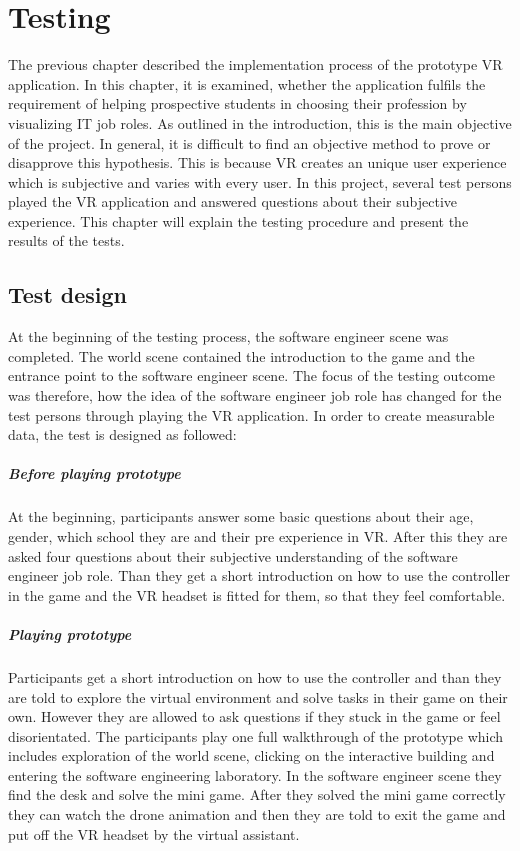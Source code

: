 \chapter{Testing}\label{testing}
The previous chapter described the implementation process of the prototype VR application. In this chapter, it is examined, whether the application fulfils the requirement of helping prospective students in choosing their profession by visualizing IT job roles. As outlined in the introduction, this is the main objective of the project. In general, it is difficult to find an objective method to prove or disapprove this hypothesis. This is because VR creates an unique user experience which is subjective and varies with every user. In this project, several test persons played the VR application and answered questions about their subjective experience. This chapter will explain the testing procedure and present the results of the tests.
\section{Test design}
At the beginning of the testing process, the software engineer scene was completed. The world scene contained the introduction to the game and the entrance point to the software engineer scene. The focus of the testing outcome was therefore, how the idea of the software engineer job role has changed for the test persons through playing the VR application. In order to create measurable data, the test is designed as followed:

\paragraph{Before playing prototype} At the beginning, participants answer some basic questions about their age, gender, which school they are and their pre experience in VR. After this they are asked four questions about their subjective understanding of the software engineer job role. Than they get a short introduction on how to use the controller in the game and the VR headset is fitted for them, so that they feel comfortable. 
\paragraph{Playing prototype} Participants get a short introduction on how to use the controller and than they are told to explore the virtual environment and solve tasks in their game on their own. However they are allowed to ask questions if they stuck in the game or feel disorientated. The participants play one full walkthrough of the prototype which includes exploration of the world scene, clicking on the interactive building and entering the software engineering laboratory. In the software engineer scene they find the desk and solve the mini game. After they solved the mini game correctly they can watch the drone animation and then they are told to exit the game and put off the VR headset by the virtual assistant.
